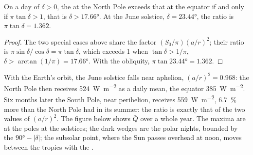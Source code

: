 \begin{proposition}\label{prop:b1:radiation-heat-transport:polar-summer}
On a day of  $\delta > 0$, the  at the North Pole
exceeds that at the equator if and only if $\pi\tan\delta > 1$, that is $\delta >
\ang{17.66}$. At the June solstice, $\delta = \ang{23.44}$, the ratio is $\pi\tan
\delta = 1.362$.
\end{proposition}

\begin{proof}
The two special cases above share the factor $(S_0/\pi)(a/r)^2$; their ratio is
$\pi\sin\delta/\cos\delta = \pi\tan\delta$, which exceeds 1 when $\tan\delta >
1/\pi$, $\delta > \arctan(1/\pi) = \ang{17.66}$. With the obliquity,
$\pi\tan\ang{23.44} = 1.362$.
\end{proof}

With the Earth's orbit, the June solstice falls near aphelion, $(a/r)^2 = 0.968$:
the North Pole then receives \qty{524}{W.m^{-2}} as a daily mean, the equator
\qty{385}{W.m^{-2}}. Six months later the South Pole, near perihelion, receives
\qty{559}{W.m^{-2}}, \qty{6.7}{\percent} more than the North Pole had in its
summer: the ratio is exactly that of the two values of $(a/r)^2$. The figure below
shows $\bar Q$ over a whole year. The maxima are at the poles at the solstices;
the dark wedges are the polar nights, bounded by the  $\ang{90} -
|\delta|$; the subsolar point, where the Sun passes overhead at noon, moves
between the tropics with the .

